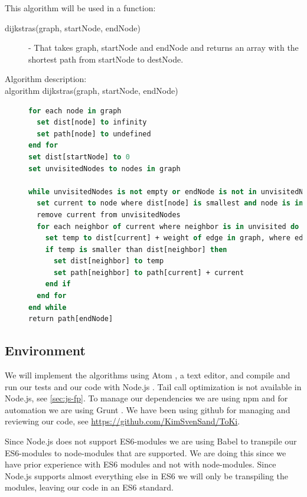 \documentclass {article}
\begin{document}
This algorithm will be used in a function:
\begin{description}
\item[dijkstras(graph, startNode, endNode)] - That takes graph, startNode and endNode and returns an array with the shortest path from startNode to destNode. 

\item [Algorithm description:]
\item[algorithm dijkstras(graph, startNode, endNode)]
\item[]
\begin{lstlisting}[language=Pascal]
for each node in graph
  set dist[node] to infinity
  set path[node] to undefined
end for
set dist[startNode] to 0
set unvisitedNodes to nodes in graph

while unvisitedNodes is not empty or endNode is not in unvisitedNodes do
  set current to node where dist[node] is smallest and node is in unvisitedNodes 
  remove current from unvisitedNodes
  for each neighbor of current where neighbor is in unvisited do
    set temp to dist[current] + weight of edge in graph, where edge is from current to neighbor
    if temp is smaller than dist[neighbor] then
      set dist[neighbor] to temp
      set path[neighbor] to path[current] + current
    end if
  end for
end while
return path[endNode]
\end{lstlisting}
\end{description}
\subsection{Environment}
We will implement the algorithms using Atom \cite{atom}, a text editor, and compile and run our tests and our code with Node.js \cite{nodejs}. Tail call optimization is not available in Node.js, see \ref{sec:js-fp}. To manage our dependencies we are using npm \cite{npm} and for automation we are using Grunt \cite{grunt}. We have been using github for managing and reviewing our code, see \url{https://github.com/KimSvenSand/ToKi}.

Since Node.js does not support ES6-modules we are using Babel \cite{babel} to transpile our ES6-modules to node-modules that are supported. We are doing this since we have prior experience with ES6 modules and not with node-modules. Since Node.js supports almost everything else in ES6 we will only be transpiling the modules, leaving our code in an ES6 standard.
\end{document}
